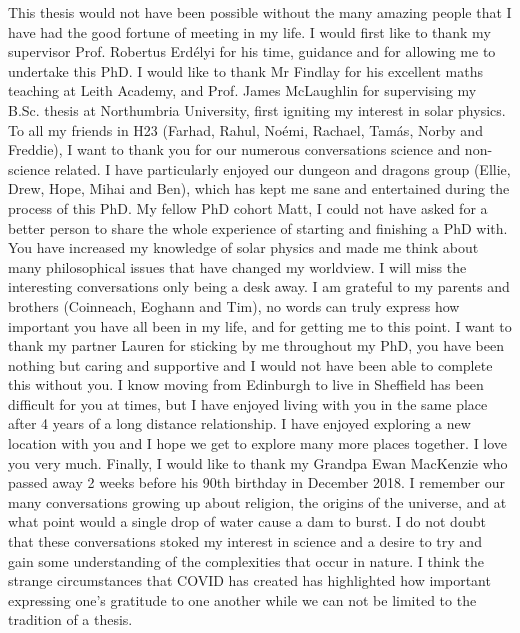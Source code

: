 \begin{acknowledgementslong}
This thesis would not have been possible without the many amazing people that I have had the good fortune of meeting in my life. I would first like to thank my supervisor Prof. Robertus Erd\'elyi for his time, guidance and for allowing me to undertake this PhD. I would like to thank Mr Findlay for his excellent maths teaching at Leith Academy, and Prof. James McLaughlin for supervising my B.Sc. thesis at Northumbria University, first igniting my interest in solar physics. \np
%
To all my friends in H23 (Farhad, Rahul, No\'emi, Rachael, Tam\'as, Norby and Freddie), I want to thank you for our numerous conversations science and non-science related. I have particularly enjoyed our dungeon and dragons group (Ellie, Drew, Hope, Mihai and Ben), which has kept me sane and entertained during the process of this PhD. My fellow PhD cohort Matt, I could not have asked for a better person to share the whole experience of starting and finishing a PhD with. You have increased my knowledge of solar physics and made me think about many philosophical issues that have changed my worldview. I will miss the interesting conversations only being a desk away. \np
%
I am grateful to my parents and brothers (Coinneach, Eoghann and Tim), no words can truly express how important you have all been in my life, and for getting me to this point. I want to thank my partner Lauren for sticking by me throughout my PhD, you have been nothing but caring and supportive and I would not have been able to complete this without you. I know moving from Edinburgh to live in Sheffield has been difficult for you at times, but I have enjoyed living with you in the same place after 4 years of a long distance relationship. I have enjoyed exploring a new location with you and I hope we get to explore many more places together. I love you very much.\np
%
Finally, I would like to thank my Grandpa Ewan MacKenzie who passed away 2 weeks before his 90th birthday in December 2018. I remember our many conversations growing up about religion, the origins of the universe, and at what point would a single drop of water cause a dam to burst. I do not doubt that these conversations stoked my interest in science and a desire to try and gain some understanding of the complexities that occur in nature. I think the strange circumstances that COVID has created has highlighted how important expressing one's gratitude to one another while we can not be limited to the tradition of a thesis.
\end{acknowledgementslong}
